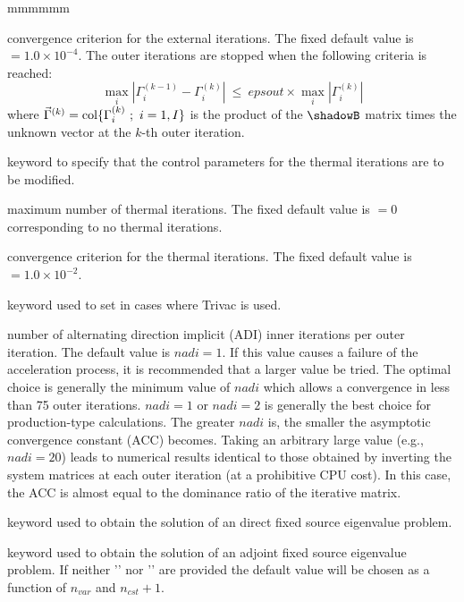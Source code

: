 \begin{ListeDeDescription}{mmmmmm}
\item[\dusa{epsout}] convergence criterion for the external iterations. The
fixed default value is  $=1.0\times 10^{-4}$. The outer iterations are stopped when the following criteria is reached:
$$\max_i | \Gamma_i^{(k-1)} - \Gamma_i^{(k)} | \ \le \ epsout \times \max_i | \Gamma_i^{(k)} |$$
\noindent where $\vec\Gamma^{(k)}={\rm col}\{\Gamma_i^{(k)} \ ; \ i=1,I\}$ is the product of the $\shadowB$ matrix times the unknown vector at the $k$-th outer iteration.

\item[\moc{THER}] keyword to specify that the control parameters for the
thermal iterations are to be modified.

\item[\dusa{maxthr}] maximum number of thermal iterations. The fixed default
value is  $=0$ corresponding to no thermal iterations.

\item[\dusa{epsthr}] convergence criterion for the thermal iterations. The
fixed default value is  $=1.0\times 10^{-2}$.

\item[\moc{ADI}] keyword used to set  in cases where Trivac is used.

\item[\dusa{nadi}] number of alternating  direction implicit (ADI) inner
iterations per outer iteration. The default value is $nadi=1$. If this value causes a failure of the acceleration process, it is recommended that a larger value be tried. The optimal
choice is generally the minimum value of $nadi$ which allows a convergence in
less than 75 outer iterations. $nadi=1$ or $nadi=2$ is generally the best
choice for production-type calculations. The greater $nadi$ is, the smaller 
the asymptotic convergence constant (ACC) becomes. Taking an arbitrary large
value (e.g., $nadi=20$) leads to numerical results identical to those obtained by
inverting the system matrices at each
outer iteration (at a prohibitive CPU cost). In this case, the ACC is almost
equal to the dominance ratio of the iterative matrix.

\item[\moc{EXPLICIT}] keyword used to obtain the solution of an direct fixed source eigenvalue problem.

\item[\moc{IMPLICIT}] keyword used to obtain the solution of an adjoint fixed source eigenvalue problem. If neither
'' nor '' are provided the default value will be chosen as a function of $n_{var}$ and $n_{cst}+1$.


\end{ListeDeDescription}
